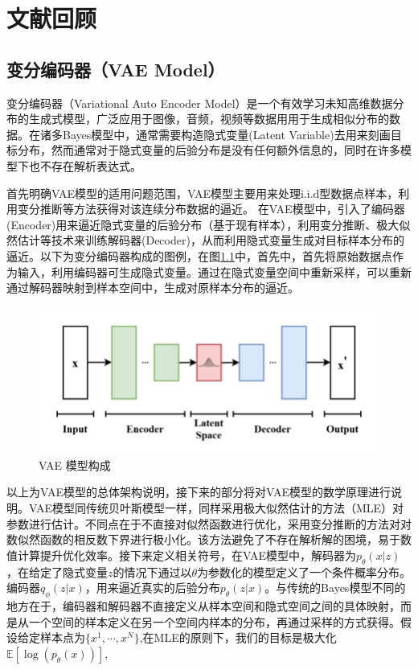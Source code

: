 \chapter{文献回顾}
\section{变分编码器（VAE Model）}
变分编码器（Variational Auto Encoder Model）是一个有效学习未知高维数据分布的生成式模型，广泛应用于图像，音频，视频等数据用用于生成相似分布的数据。在诸多Bayes模型中，通常需要构造隐式变量(Latent Variable)去用来刻画目标分布，然而通常对于隐式变量的后验分布是没有任何额外信息的，同时在许多模型下也不存在解析表达式。\par 
首先明确VAE模型的适用问题范围，VAE模型主要用来处理i.i.d型数据点样本，利用变分推断等方法获得对该连续分布数据的逼近。
在VAE模型中，引入了编码器(Encoder)用来逼近隐式变量的后验分布（基于现有样本），利用变分推断、极大似然估计等技术来训练解码器(Decoder)，从而利用隐式变量生成对目标样本分布的逼近。以下为变分编码器构成的图例，在图\ref{VAE model fig}中，首先中，首先将原始数据点作为输入，利用编码器可生成隐式变量。通过在隐式变量空间中重新采样，可以重新通过解码器映射到样本空间中，生成对原样本分布的逼近。
\begin{figure}[H]
    \centering
    \includegraphics[scale = 0.7]{ThuThesis_ Tsinghua University Thesis LaTeX Template/Picture/VAE.png}
    \caption{VAE 模型构成}
    \label{VAE model fig}
\end{figure}
以上为VAE模型的总体架构说明，接下来的部分将对VAE模型的数学原理进行说明。VAE模型同传统贝叶斯模型一样，同样采用极大似然估计的方法（MLE）对参数进行估计。不同点在于不直接对似然函数进行优化，采用变分推断的方法对对数似然函数的相反数下界进行极小化。该方法避免了不存在解析解的困境，易于数值计算提升优化效率。接下来定义相关符号，在VAE模型中，解码器为$p_{\theta}(x|z)$，在给定了隐式变量$z$的情况下通过以$\theta$为参数化的模型定义了一个条件概率分布。编码器$q_{\phi}(z|x)$，用来逼近真实的后验分布$p_{\theta}(z|x)$。与传统的Bayes模型不同的地方在于，编码器和解码器不直接定义从样本空间和隐式空间之间的具体映射，而是从一个空间的样本定义在另一个空间内样本的分布，再通过采样的方式获得。假设给定样本点为$\{x^1,\cdots,x^{N}\}$,在MLE的原则下，我们的目标是极大化$\mathbb{E}[\log(p_{\theta}(x))]$,
